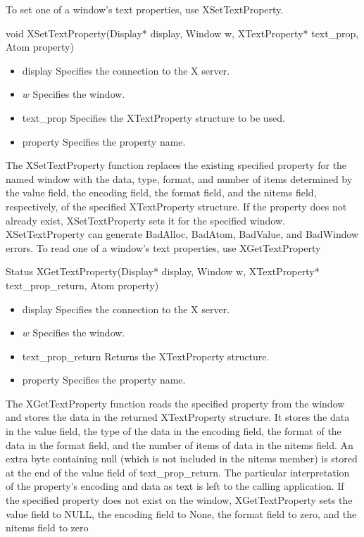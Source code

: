 \documentclass{report}
\begin{document}
\begin{itemize}
\begin{itemize}
            \bigbreak \noindent 
            To set one of a window’s text properties, use XSetTextProperty.
            \bigbreak \noindent 
            \begin{cppcode}
            void XSetTextProperty(Display* display, Window w, XTextProperty* text_prop, Atom property)
            \end{cppcode}
            \bigbreak \noindent
            \begin{itemize}
                \item display Specifies the connection to the X server.
                \item $w$ Specifies the window.
                \item text\_prop Specifies the XTextProperty structure to be used.
                \item property Specifies the property name.
            \end{itemize}
            The XSetTextProperty function replaces the existing specified property for the named window with the data, type, format, and number of items determined by the value field, the encoding field, the format field, and the nitems field, respectively, of the specified XTextProperty structure. If the property does not already exist, XSetTextProperty sets it for the specified window.
            \bigbreak \noindent 
            XSetTextProperty can generate BadAlloc, BadAtom, BadValue, and BadWindow errors.
            \bigbreak \noindent 
            To read one of a window’s text properties, use XGetTextProperty
            \bigbreak \noindent 
            \begin{cppcode}
                Status XGetTextProperty(Display* display, Window w, XTextProperty* text_prop_return, Atom property)
            \end{cppcode}
            \bigbreak \noindent
            \begin{itemize}
                \item display Specifies the connection to the X server.
                \item $w$ Specifies the window.
                \item text\_prop\_return Returns the XTextProperty structure.
                \item property Specifies the property name.
            \end{itemize}
            The XGetTextProperty function reads the specified property from the window and stores the data in the returned XTextProperty structure. It stores the data in the value field, the type of the data in the encoding field, the format of the data in the format field, and the number of items of data in the nitems field. An extra byte containing null (which is not included in the nitems member) is stored at the end of the value field of text_prop_return. The particular interpretation of the property’s encoding and data as text is left to the calling application. If the specified property does not exist on the window, XGetTextProperty sets the value field to NULL, the encoding field to None, the format field to zero, and the nitems field to zero

\end{itemize}
\end{itemize}
\end{document}
